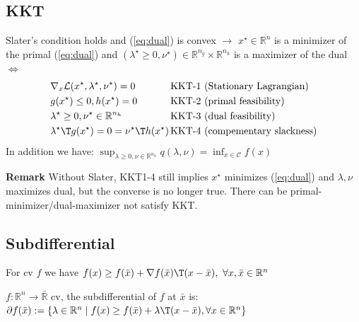 \subsection{KKT} %

\begin{theorem}
	Slater's condition holds
	and (\ref{eq:dual}) is convex
	$\rightarrow$
	$x^\star \in \mathbb{R}^{n}$ is a minimizer of the primal (\ref{eq:dual})
	and $(\lambda^\star \ge 0,\nu^\star) \in \mathbb{R}^{n_g}\times\mathbb{R}^{n_h}$ is a maximizer of the dual
	$\Leftrightarrow$
	$$\begin{aligned}
			              & \nabla_x\mathcal{L}(x^\star,\lambda^\star,\nu^\star)=0
			              & \text{KKT-1 }
			              & \text{(Stationary Lagrangian)}
			\\
			              & g(x^\star)\le0, h(x^\star)=0
			              & \text{KKT-2 }
			              & \text{(primal feasibility)}
			\\
			              & \lambda^\star\ge0, \nu^\star \in \mathbb{R}^{n_h}
			              & \text{KKT-3 }
			              & \text{(dual feasibility)}
			\\
			              & {\lambda^\star}\T g(x^\star)=0={\nu^\star}\T h(x^\star)
			\hspace{-3mm} &
			\text{KKT-4 }
			              & \text{(compementary slackness)}
			\\
		\end{aligned}$$
	In addition we have:
	$\sup_{\lambda\ge0,\nu\in\mathbb{R}^{n_h}}q(\lambda,\nu)=\inf_{x\in\mathcal{C}}f(x)$
\end{theorem}

\textbf{Remark} Without Slater,
KKT1-4 still implies $x^\star$ minimizes (\ref{eq:dual})
and $\lambda,\nu$ maximizes dual,
but the converse is no longer true.
There can be primal-minimizer/dual-maximizer not satisfy KKT.

\subsection{Subdifferential}

For cv $f$ we have
$f(x)\ge f(\bar{x})+\nabla f(\bar{x})\T(x-\bar{x}),\ \forall x,\bar{x}\in \mathbb{R}^{n}$

\begin{definition}
	$f: \mathbb{R}^{n} \rightarrow \bar{\mathbb{R}}$ cv,
	the subdifferential of $f$ at $\bar{x}$ is:
	$\partial f(\bar{x}):=
		\{\lambda \in \mathbb{R}^{n} \mid
		f(x)\ge f(\bar{x})+\lambda\T(x-\bar{x}),
		\forall x \in \mathbb{R}^{n}
		\}$
	\label{def:subdifferential}
\end{definition}

